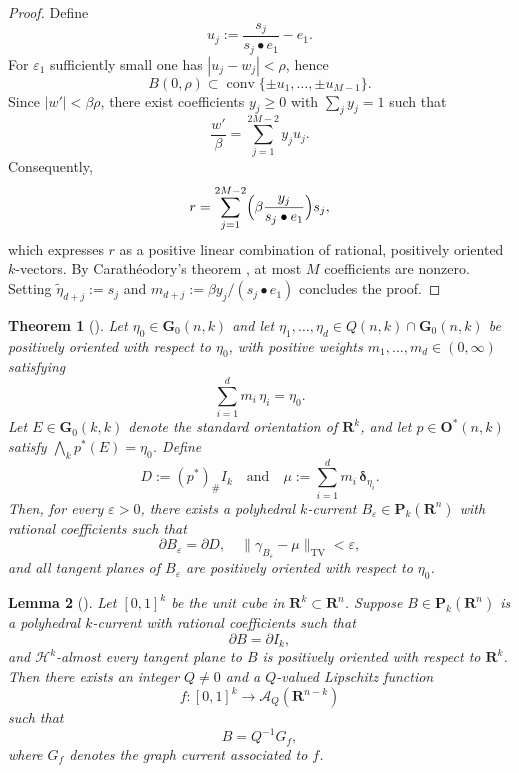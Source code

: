 \documentclass[a4paper,twoside,reqno]{article}
\theoremstyle{definition}
\theoremstyle{remark}
\theoremstyle{plain}
\newtheorem{theorem}{Theorem}[section]
\newtheorem{lemma}[theorem]{Lemma}
\theoremstyle{remark}
\theoremstyle{definition}
\newcommand{\ograss}[2]{\mathbf{G}_0(#1,#2)}
\newcommand{\PC}[1]{\mathbf{P}_{#1}}
\newcommand{\R}{\mathbf{R}}
\newcommand{\HM}{\mathscr{H}}
\newcommand{\tbwedge}{{\textstyle \boldsymbol{\bigwedge}}}
\newcommand{\Dirac}[1]{\boldsymbol{\delta}_{#1}}
\newcommand{\orthproj}[2]{\mathbf{O}^\ast({#1},{#2})}
\newcommand{\qspace}[1]{\mathcal{A}_{{#1}}}
\begin{document}
\begin{proof}
    Define
    \[
        u_j:=\frac{s_j}{s_j\bullet e_1}-e_1.
    \]
    For $\varepsilon_1$ sufficiently small one has $|u_j-w_j|<\rho$, hence
    \[
        B(0,\rho)\subset\operatorname{conv}\{\pm u_1,\dots,\pm u_{M-1}\}.
    \]
    Since $|w'|<\beta\rho$, there exist coefficients $y_j\ge0$ with
    $\sum_j y_j=1$ such that
    \[
        \frac{w'}{\beta}=\sum_{j=1}^{2M-2} y_j u_j.
    \]
    Consequently,
    \[
        r=\sum_{j=1}^{2M-2}\Bigl(\beta\frac{y_j}{s_j\bullet e_1}\Bigr)s_j,
    \]
    which expresses $r$ as a positive linear combination of rational, positively 
    oriented $k$-vectors. By Carath\'eodory’s theorem \cite[Theorem~17.1.2]{Rockafellar1970},
    at most $M$ coefficients are nonzero. Setting $\tilde\eta_{d+j}:=s_j$ and 
    $m_{d+j}:=\beta y_j/(s_j\bullet e_1)$ concludes the proof.
\end{proof}

\begin{theorem}[]
    \label{thm:antonio}
    Let $\eta_0 \in \ograss nk$ and let $\eta_1, \dots, \eta_d \in Q(n,k) \cap \ograss nk$ 
    be positively oriented with respect to $\eta_0$, with positive weights 
    $m_1, \dots, m_d \in (0,\infty)$ satisfying
    \[
        \sum_{i=1}^d m_i \, \eta_i = \eta_0.
    \]
    Let $E \in \ograss kk$ denote the standard orientation of $\R^k$, and let $p \in \orthproj nk$ satisfy $\tbwedge_k p^*(E) = \eta_0$. Define
    \[
        D := (p^*)_\# I_k \quad \text{and} \quad \mu := \sum_{i=1}^d m_i \, \Dirac{\eta_i}.
    \]
    Then, for every $\varepsilon > 0$, there exists a polyhedral $k$-current
    $B_{\varepsilon} \in \PC{k}(\R^n)$ with rational coefficients such that
    \[
        \partial B_{\varepsilon} = \partial D, \quad
        \|\gamma_{B_{\varepsilon}} - \mu\|_{\mathrm{TV}} < \varepsilon,
    \]
    and all tangent planes of $B_\varepsilon$ are positively oriented with respect 
    to $\eta_0$.
\end{theorem}

\begin{lemma}[]\label{lemma:antonio}
    Let $[0,1]^k$ be the unit cube in $\R^k \subset \R^n$. Suppose 
    $B \in \PC{k}(\R^n)$ is a polyhedral $k$-current with rational 
    coefficients such that
    \[
        \partial B = \partial I_k,
    \]
    and $\HM^k$-almost every tangent plane to $B$ is positively oriented 
    with respect to $\R^k$. Then there exists an integer $Q \neq 0$ and 
    a $Q$-valued Lipschitz function
    \[
        f : [0,1]^k \longrightarrow \qspace{Q}(\R^{n-k})
    \]
    such that
    \[
        B = Q^{-1} G_f,
    \]
    where $G_f$ denotes the graph current associated to $f$.
\end{lemma}
\end{document}
